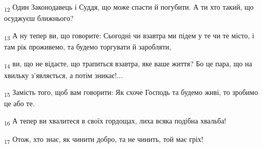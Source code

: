 \begin{tcolorbox}
\textsubscript{12} Один Законодавець і Суддя, що може спасти й погубити. А ти хто такий, що осуджуєш ближнього?
\end{tcolorbox}
\begin{tcolorbox}
\textsubscript{13} А ну тепер ви, що говорите: Сьогодні чи взавтра ми підем у те чи те місто, і там рік проживемо, та будемо торгувати й заробляти,
\end{tcolorbox}
\begin{tcolorbox}
\textsubscript{14} ви, що не відаєте, що трапиться взавтра, яке ваше життя? Бо це пара, що на хвильку з'являється, а потім зникає!...
\end{tcolorbox}
\begin{tcolorbox}
\textsubscript{15} Замість того, щоб вам говорити: Як схоче Господь та будемо живі, то зробимо це або те.
\end{tcolorbox}
\begin{tcolorbox}
\textsubscript{16} А тепер ви хвалитеся в своїх гордощах, лиха всяка подібна хвальба!
\end{tcolorbox}
\begin{tcolorbox}
\textsubscript{17} Отож, хто знає, як чинити добро, та не чинить, той має гріх!
\end{tcolorbox}
